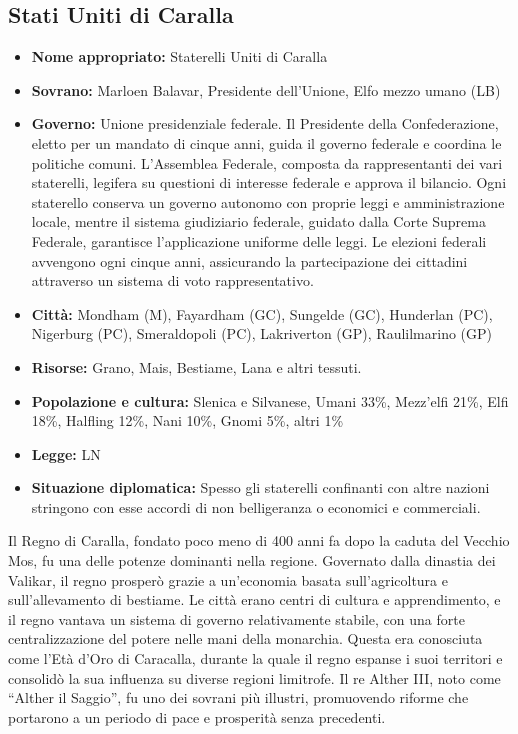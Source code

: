 \documentclass[a4paper]{report}
\begin{document}
\begin{multicols}{2}
\subsection*{Stati Uniti di Caralla}
\begin{itemize}
	\item \textbf{Nome appropriato:} Staterelli Uniti di Caralla
	\item \textbf{Sovrano:} Marloen Balavar, Presidente dell'Unione, Elfo mezzo umano (LB)
	\item \textbf{Governo:} Unione presidenziale federale. Il Presidente della Confederazione, eletto per un mandato di cinque anni, guida il governo federale e coordina le politiche comuni. L'Assemblea Federale, composta da rappresentanti dei vari staterelli, legifera su questioni di interesse federale e approva il bilancio. Ogni staterello conserva un governo autonomo con proprie leggi e amministrazione locale, mentre il sistema giudiziario federale, guidato dalla Corte Suprema Federale, garantisce l’applicazione uniforme delle leggi. Le elezioni federali avvengono ogni cinque anni, assicurando la partecipazione dei cittadini attraverso un sistema di voto rappresentativo.
	\item \textbf{Città:} Mondham (M), Fayardham (GC), Sungelde (GC), Hunderlan (PC), Nigerburg (PC), Smeraldopoli (PC), Lakriverton (GP), Raulilmarino (GP)
	\item \textbf{Risorse:} Grano, Mais, Bestiame, Lana e altri tessuti.
	\item \textbf{Popolazione e cultura:} Slenica e Silvanese, Umani 33\%, Mezz'elfi 21\%, Elfi 18\%, Halfling 12\%, Nani 10\%, Gnomi 5\%, altri 1\%
	\item \textbf{Legge:} LN
	\item \textbf{Situazione diplomatica:} Spesso gli staterelli confinanti con altre nazioni stringono con esse accordi di non belligeranza o economici e commerciali.
\end{itemize}
Il Regno di Caralla, fondato poco meno di 400 anni fa dopo la caduta del Vecchio Mos, fu una delle potenze dominanti nella regione. Governato dalla dinastia dei Valikar, il regno prosperò grazie a un'economia basata sull'agricoltura e sull'allevamento di bestiame. Le città erano centri di cultura e apprendimento, e il regno vantava un sistema di governo relativamente stabile, con una forte centralizzazione del potere nelle mani della monarchia.
Questa era conosciuta come l'Età d'Oro di Caracalla, durante la quale il regno espanse i suoi territori e consolidò la sua influenza su diverse regioni limitrofe. Il re Alther III, noto come “Alther il Saggio”, fu uno dei sovrani più illustri, promuovendo riforme che portarono a un periodo di pace e prosperità senza precedenti.

\end{multicols}
\end{document}
